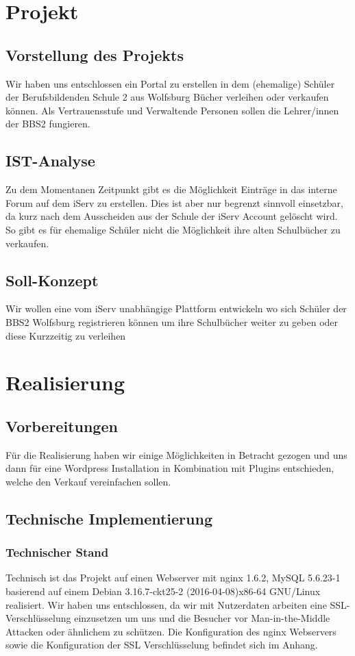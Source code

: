 \documentclass[a4paper, DIV20, 11pt, headsepline, parskip]{article}
\title{\usubject}
\author{\uauthor}
\newcommand{\udate}{05.06.2016}
\begin{document}
\date{\udate}
\maketitle
\thispagestyle{empty}
\newpage
\tableofcontents
\pagebreak
\section{Projekt}

\subsection{Vorstellung des Projekts}
Wir haben uns entschlossen ein Portal zu erstellen in dem (ehemalige) Schüler der Berufsbildenden Schule 2 aus Wolfsburg Bücher verleihen oder verkaufen können.
Als Vertrauensstufe und Verwaltende Personen sollen die Lehrer/innen der BBS2 fungieren. 
\subsection{IST-Analyse}
Zu dem Momentanen Zeitpunkt gibt es die Möglichkeit Einträge in das interne Forum auf dem iServ zu erstellen.
Dies ist aber nur begrenzt sinnvoll einsetzbar, da kurz nach dem Ausscheiden aus der Schule der iServ Account gelöscht wird.
So gibt es für ehemalige Schüler nicht die Möglichkeit ihre alten Schulbücher zu verkaufen.
\subsection{Soll-Konzept}
Wir wollen eine vom iServ unabhängige Plattform entwickeln wo sich Schüler der BBS2 Wolfsburg registrieren können um ihre Schulbücher weiter zu geben oder diese Kurzzeitig zu verleihen
\section{Realisierung}
\subsection{Vorbereitungen}
Für die Realisierung haben wir einige Möglichkeiten in Betracht gezogen und uns dann für eine Wordpress Installation in Kombination mit Plugins entschieden, welche den Verkauf vereinfachen sollen.
\subsection{Technische Implementierung}
\subsubsection{Technischer Stand}
Technisch ist das Projekt auf einen Webserver mit nginx 1.6.2,
MySQL 5.6.23-1 basierend auf einem
Debian 3.16.7-ckt25-2 (2016-04-08)x86-64 GNU/Linux 
realisiert.
Wir haben uns entschlossen, da wir mit Nutzerdaten arbeiten eine SSL-Verschlüsselung einzusetzen um uns und die Besucher vor Man-in-the-Middle Attacken oder ähnlichem zu schützen.
Die Konfiguration des nginx Webservers sowie die Konfiguration der SSL Verschlüsselung befindet sich im Anhang.
\end{document}
